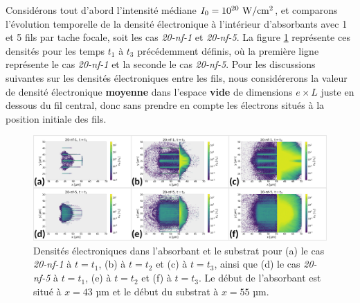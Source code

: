 \begin{refsection}
Considérons tout d'abord l'intensité médiane $I_0=10^{20} ~ \rm W/cm^2$, et comparons l'évolution temporelle de la densité électronique à l'intérieur d'absorbants avec 1 et 5 fils par tache focale, soit les cas \textit{20-nf-1} et \textit{20-nf-5}. La figure \ref{fig:62-evolution_ne} représente ces densités pour les temps $t_1$ à $t_3$ précédemment définis, où la première ligne représente le cas \textit{20-nf-1} et la seconde le cas \textit{20-nf-5}. Pour les discussions suivantes sur les densités électroniques entre les fils, nous considérerons la valeur de densité électronique \textbf{moyenne} dans l'espace \textbf{vide} de dimensions $e \times L$ juste en dessous du fil central, donc sans prendre en compte les électrons situés à la position initiale des fils.

\begin{figure}[hbtp]
	\centering
	\includegraphics[width=\linewidth]{6-opti_numerique/nf5_vs_nf1_ne.png}
	\caption{Densités électroniques dans l'absorbant et le substrat pour (a) le cas \textit{20-nf-1} à $t=t_1$, (b) à $t=t_2$ et (c) à $t=t_3$, ainsi que (d) le cas \textit{20-nf-5} à $t=t_1$, (e) à $t=t_2$ et (f) à $t=t_3$. Le début de l'absorbant est situé à $x=43$ µm et le début du substrat à $x=55$ µm.}
	\label{fig:62-evolution_ne}
\end{figure}


\end{refsection}
